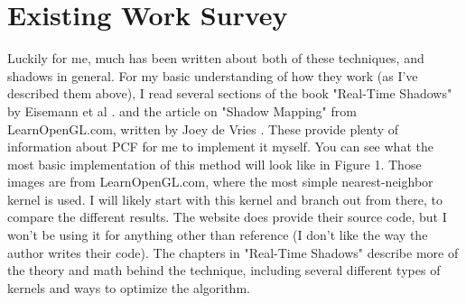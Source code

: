 \documentclass{article}
\begin{document}

\section{Existing Work Survey} %

Luckily for me, much has been written about both of these techniques, and shadows in general. For my basic understanding of how they work (as I've described them above), I read several sections of the book "Real-Time Shadows" by Eisemann et al \cite{eisemann2011real}. and the article on "Shadow Mapping" from LearnOpenGL.com, written by Joey de Vries \cite{de2015learn}. These provide plenty of information about PCF for me to implement it myself. You can see what the most basic implementation of this method will look like in Figure 1. Those images are from LearnOpenGL.com, where the most simple nearest-neighbor kernel is used. I will likely start with this kernel and branch out from there, to compare the different results. The website does provide their source code, but I won't be using it for anything other than reference (I don't like the way the author writes their code). The chapters in "Real-Time Shadows" describe more of the theory and math behind the technique, including several different types of kernels and ways to optimize the algorithm.
\end{document}
